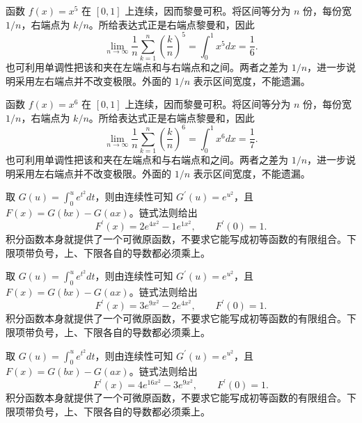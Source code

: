 \documentclass[UTF8,12pt,a4paper,fontset=fandol]{ctexart}
\begin{document}
\begin{solve}\label{ans:c17q7}
函数 $f(x)=x^{5}$ 在 $[0,1]$ 上连续，因而黎曼可积。将区间等分为 $n$ 份，每份宽 $1/n$，右端点为 $k/n$。所给表达式正是右端点黎曼和，因此
\[
\lim_{n\to\infty}\frac1n\sum_{k=1}^n\left(\frac kn\right)^{5}=\int_0^1x^{5}dx=\frac{1}{6}.
\]
也可利用单调性把该和夹在左端点和与右端点和之间。两者之差为 $1/n$，进一步说明采用左右端点并不改变极限。外面的 $1/n$ 表示区间宽度，不能遗漏。
\end{solve}

\begin{solve}\label{ans:c17q8}
函数 $f(x)=x^{6}$ 在 $[0,1]$ 上连续，因而黎曼可积。将区间等分为 $n$ 份，每份宽 $1/n$，右端点为 $k/n$。所给表达式正是右端点黎曼和，因此
\[
\lim_{n\to\infty}\frac1n\sum_{k=1}^n\left(\frac kn\right)^{6}=\int_0^1x^{6}dx=\frac{1}{7}.
\]
也可利用单调性把该和夹在左端点和与右端点和之间。两者之差为 $1/n$，进一步说明采用左右端点并不改变极限。外面的 $1/n$ 表示区间宽度，不能遗漏。
\end{solve}

\begin{solve}\label{ans:c17q9}
取 $G(u)=\int_0^u e^{t^2}dt$，则由连续性可知 $G^{\prime}(u)=e^{u^2}$，且 $F(x)=G(bx)-G(ax)$。链式法则给出
\[
F^{\prime}(x)=2e^{4x^2}-1e^{1x^2},\qquad F^{\prime}(0)=1.
\]
积分函数本身就提供了一个可微原函数，不要求它能写成初等函数的有限组合。下限项带负号，上、下限各自的导数都必须乘上。
\end{solve}

\begin{solve}\label{ans:c17q10}
取 $G(u)=\int_0^u e^{t^2}dt$，则由连续性可知 $G^{\prime}(u)=e^{u^2}$，且 $F(x)=G(bx)-G(ax)$。链式法则给出
\[
F^{\prime}(x)=3e^{9x^2}-2e^{4x^2},\qquad F^{\prime}(0)=1.
\]
积分函数本身就提供了一个可微原函数，不要求它能写成初等函数的有限组合。下限项带负号，上、下限各自的导数都必须乘上。
\end{solve}

\begin{solve}\label{ans:c17q11}
取 $G(u)=\int_0^u e^{t^2}dt$，则由连续性可知 $G^{\prime}(u)=e^{u^2}$，且 $F(x)=G(bx)-G(ax)$。链式法则给出
\[
F^{\prime}(x)=4e^{16x^2}-3e^{9x^2},\qquad F^{\prime}(0)=1.
\]
积分函数本身就提供了一个可微原函数，不要求它能写成初等函数的有限组合。下限项带负号，上、下限各自的导数都必须乘上。
\end{solve}
\end{document}
